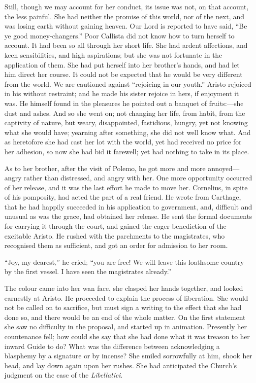 Still, though we may account for her conduct, its issue was not, on
that account, the less painful. She had neither the promise of this
world, nor of the next, and was losing earth without gaining heaven.
Our Lord is reported to have said, ``Be ye good
money-changers.'' Poor Callista did not know how to turn herself
to account. It had been so all through her short life. She had ardent
affections, and keen sensibilities, and high aspirations; but she was
not fortunate in the application of them. She had put herself into her
brother's hands, and had let him direct her course. It could not be
expected that he would be very different from the world. We are
cautioned against ``rejoicing in our youth.'' Aristo rejoiced
in his without restraint; and he made his sister rejoice in hers, if
enjoyment it was. He himself found in the pleasures he pointed out a
banquet of fruits:—she dust and ashes. And so she went on; not
changing her life, from habit, from the captivity of nature, but
weary, disappointed, fastidious, hungry, yet not knowing what she
would have; yearning after something, she did not well know what. And
as heretofore she had cast her lot with the world, yet had received no
price for her adhesion, so now she had bid it farewell; yet had
nothing to take in its place.

As to her brother, after the visit of Polemo, he got more and more
annoyed—angry rather than distressed, and angry with her. One more
opportunity occurred of her release, and it was the last effort he
made to move her. Cornelius, in spite of his pomposity, had acted the
part of a real friend. He wrote from Carthage, that he had happily
succeeded in his application to government, and, difficult and unusual
as was the grace, had obtained her release. He sent the formal
documents for carrying it through the court, and gained the eager
benediction of the excitable Aristo. He rushed with the parchments to
the magistrates, who recognised them as sufficient, and got an order
for admission to her room.

``Joy, my dearest,'' he cried; ``you are free! We will
leave this loathsome country by the first vessel. I have seen the
magistrates already.''

The colour came into her wan face, she clasped her hands together,
and looked earnestly at Aristo. He proceeded to explain the process of
liberation. She would not be called on to sacrifice, but must sign a
writing to the effect that she had done so, and there would be an end
of the whole matter. On the first statement she saw no difficulty in
the proposal, and started up in animation. Presently her countenance
fell; how could she say that she had done what it was treason to her
inward Guide to do? What was the difference between acknowledging a
blasphemy by a signature or by incense? She smiled sorrowfully at him,
shook her head, and lay down again upon her rushes. She had
anticipated the Church's judgment on the case of the \emph{Libellatici}.

